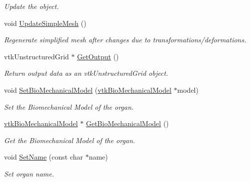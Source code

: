 \begin{DoxyCompactItemize}
\begin{DoxyCompactList}\small\item\em Update the object. \item\end{DoxyCompactList}\item 
\hypertarget{classvtkOrgan_a943994fbb1b4f8a8e72f647f631cdd81}{
void \hyperlink{classvtkOrgan_a943994fbb1b4f8a8e72f647f631cdd81}{UpdateSimpleMesh} ()}
\label{classvtkOrgan_a943994fbb1b4f8a8e72f647f631cdd81}

\begin{DoxyCompactList}\small\item\em Regenerate simplified mesh after changes due to transformations/deformations. \item\end{DoxyCompactList}\item 
vtkUnstructuredGrid $\ast$ \hyperlink{classvtkOrgan_af8cbaa36f1dbf97b5314dfe128aaf444}{GetOutput} ()
\begin{DoxyCompactList}\small\item\em Return output data as an vtkUnstructuredGrid object. \item\end{DoxyCompactList}\item 
void \hyperlink{classvtkOrgan_ad163fb8b19cb52cf99eb350512945510}{SetBioMechanicalModel} (\hyperlink{classvtkBioMechanicalModel}{vtkBioMechanicalModel} $\ast$model)
\begin{DoxyCompactList}\small\item\em Set the Biomechanical Model of the organ. \item\end{DoxyCompactList}\item 
\hyperlink{classvtkBioMechanicalModel}{vtkBioMechanicalModel} $\ast$ \hyperlink{classvtkOrgan_a557162900b7880dac34acca512bcebd0}{GetBioMechanicalModel} ()
\begin{DoxyCompactList}\small\item\em Get the Biomechanical Model of the organ. \item\end{DoxyCompactList}\item 
void \hyperlink{classvtkOrgan_a55ca17e15fea6a6c1672f8b271546e6b}{SetName} (const char $\ast$name)
\begin{DoxyCompactList}\small\item\em Set organ name. \item\end{DoxyCompactList}\item 

\end{DoxyCompactItemize}
